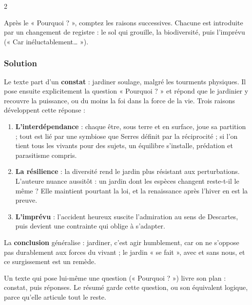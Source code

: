 \documentclass[11pt,a4paper]{article}
\providecommand{\tightlist}{\setlength{\itemsep}{0pt}\setlength{\parskip}{0pt}}
\begin{document}
\begin{indication}{2}

Après le « Pourquoi ? », comptez les raisons successives. Chacune est introduite par un changement de registre : le sol qui grouille, la biodiversité, puis l'imprévu (« Car inéluctablement\ldots{} »).

\end{indication}

\hypertarget{solution}{%
\subsubsection{Solution}\label{solution}}

Le texte part d'un \textbf{constat} : jardiner soulage, malgré les tourments physiques. Il pose ensuite explicitement la question « Pourquoi ? » et répond que le jardinier y recouvre la puissance, ou du moins la foi dans la force de la vie. Trois raisons développent cette réponse :

\begin{enumerate}
\def\labelenumi{\arabic{enumi}.}
\tightlist
\item
  \textbf{L'interdépendance} : chaque être, sous terre et en surface, joue sa partition ; tout est lié par une symbiose que Serres définit par la réciprocité ; si l'on tient tous les vivants pour des sujets, un équilibre s'installe, prédation et parasitisme compris.
\item
  \textbf{La résilience} : la diversité rend le jardin plus résistant aux perturbations. L'auteure nuance aussitôt : un jardin dont les espèces changent reste-t-il le même ? Elle maintient pourtant la loi, et la renaissance après l'hiver en est la preuve.
\item
  \textbf{L'imprévu} : l'accident heureux suscite l'admiration au sens de Descartes, puis devient une contrainte qui oblige à s'adapter.
\end{enumerate}

La \textbf{conclusion} généralise : jardiner, c'est agir humblement, car on ne s'oppose pas durablement aux forces du vivant ; le jardin « se fait », avec et sans nous, et ce surgissement est un remède.

\begin{methode}

Un texte qui pose lui-même une question (« Pourquoi ? ») livre son plan : constat, puis réponses. Le résumé garde cette question, ou son équivalent logique, parce qu'elle articule tout le reste.

\end{methode}
\end{document}
